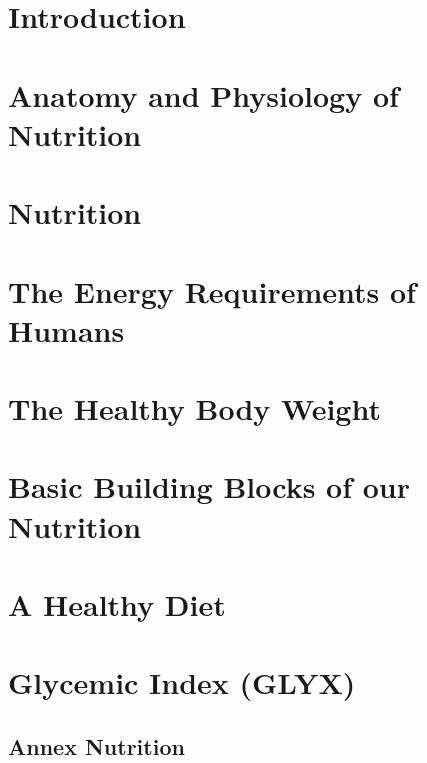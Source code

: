 \documentclass[../main.tex]{subfiles}
\begin{document}
\chapter{Introduction}


\chapter{Anatomy and Physiology of Nutrition}


\chapter{Nutrition}

\chapter{The Energy Requirements of Humans} %


\chapter{The Healthy Body Weight} %


\chapter{Basic Building Blocks of our Nutrition}

\chapter{A Healthy Diet}


\chapter{Glycemic Index (GLYX)}





\section{Annex Nutrition}



\end{document}
